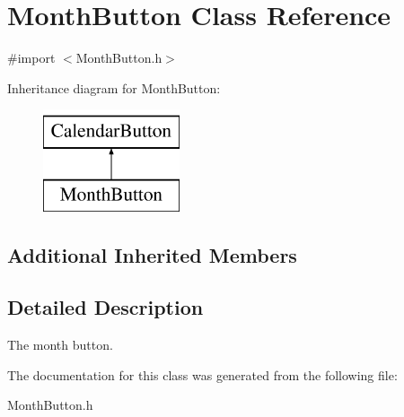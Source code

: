 \hypertarget{interface_month_button}{\section{Month\+Button Class Reference}
\label{interface_month_button}
}


{\ttfamily \#import $<$Month\+Button.\+h$>$}

Inheritance diagram for Month\+Button\+:\begin{figure}[H]
\begin{center}
\leavevmode
\includegraphics[height=3.000000cm]{interface_month_button}
\end{center}
\end{figure}
\subsection*{Additional Inherited Members}


\subsection{Detailed Description}
The month button. 

The documentation for this class was generated from the following file\+:\begin{DoxyCompactItemize}
\item 
Month\+Button.\+h\end{DoxyCompactItemize}
